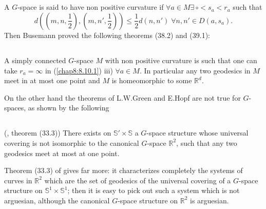 \subsection{}\label{chap8:8.10.2}

\begin{defi*}
A $G$-space is said to have non positive curvature if \; $\forall a\in
M\exists\, \circ <s_{a}<r_{a}$ such that
$$
d((m,n,\frac{1}{2}),(m,n',\frac{1}{2}))\leq\frac{1}{2}d(n,n') \; \forall
n,n'\in D(a,s_{a}).
$$
Then Busemann proved the following theorems \cite{7} (38.2) and (39.1):
\end{defi*}

\subsection{}\label{chap8:8.10.3}

\begin{theorem*}
A simply connected $G$-space $M$ with non positive curvature is such
that one can take $r_{a}=\infty$ in (\ref{chap8:8.10.1}) iii) $\forall a\in
M$. In particular any two geodesics in $M$ meet in at most one point
and $M$ is homeomorphic to some $\mathbb{R}^{d}$.
\end{theorem*}

On the other hand the theorems of L.W.\@ Green and E.\@ Hopf are not
true for $G$-spaces, as shown by the following

\subsection{}\label{chap8:8.10.4}

\begin{theorem*}(\cite{7}, theorem (33.3))
There exists on $\mathbb{S}'\times \mathbb{S}$ a $G$-space structure
whose universal covering is not isomorphic to the canonical $G$-space
$\mathbb{R}^{2}$, such that any two geodesics meet at most at one point.
\end{theorem*}

Theorem (33.3) of \cite{7} gives far more: it characterizes completely
the systems of curves in $\mathbb{R}^{2}$ which are the set of
geodesics of the universal covering of a $G$-space structure on
$\mathbb{S}^{1}\times\mathbb{S}^{1}$; then it is easy to pick out such
a system which is not arguesian, although the canonical $G$-space
structure on $\mathbb{R}^{2}$ is arguesian.

\subsection{}\label{chap8:8.10.5}

